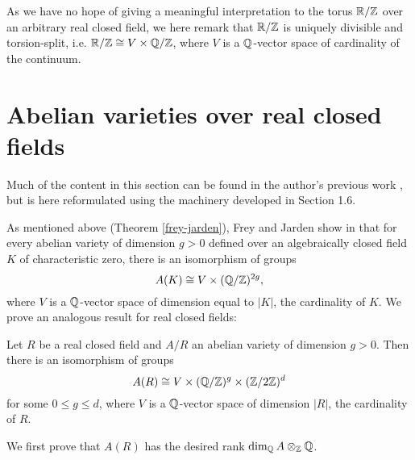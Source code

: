As we have no hope of giving a meaningful interpretation to the torus $\mathbb{R}/\mathbb{Z}$ over an arbitrary real closed field, we here remark that $\mathbb{R}/\mathbb{Z}$ is uniquely divisible and torsion-split, i.e. $\mathbb{R}/\mathbb{Z}\cong V\times \mathbb{Q}/\mathbb{Z}$, where $V$ is a $\mathbb{Q}$-vector space of cardinality of the continuum.

\section{Abelian varieties over real closed fields}
Much of the content in this section can be found in the author's previous work \cite{lowry2023abelian}, but is here reformulated using the machinery developed in Section 1.6.

As mentioned above (Theorem \ref{frey-jarden}), Frey and Jarden show in \cite{frey-jarden} that for every abelian variety of dimension $g>0$ defined over an algebraically closed field $K$ of characteristic zero, there is an isomorphism of groups $$A(K)\cong V\times(\mathbb{Q}/\mathbb{Z})^{2g},$$ where $V$ is a $\mathbb{Q}$-vector space of dimension equal to $|K|$, the cardinality of $K$. We prove an analogous result for real closed fields:

\begin{theorem}
\label{structure-of-realclosed-AVs}
Let $R$ be a real closed field and $A/R$ an abelian variety of dimension $g>0$. Then there is an isomorphism of groups $$A(R)\cong V \times (\mathbb{Q}/\mathbb{Z})^g\times (\mathbb{Z}/2\mathbb{Z})^d$$ for some $0\leq g \leq d$, where $V$ is a $\mathbb{Q}$-vector space of dimension $|R|$, the cardinality of $R$.
\end{theorem}

We first prove that $A(R)$ has the desired rank $\operatorname{dim}_{\mathbb{Q}}A\otimes_{\mathbb{Z}} \mathbb{Q}$.


